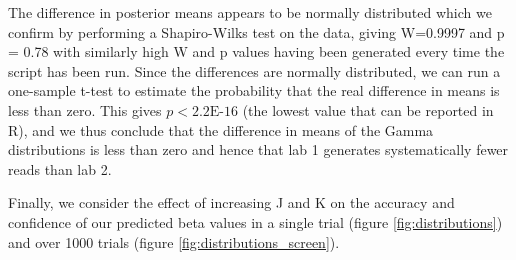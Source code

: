 \documentclass{article}
\begin{document}
%
%
%
%
%
%
\newpage
The difference in posterior means appears to be normally distributed which we confirm by performing a Shapiro-Wilks test on the data, giving W=0.9997 and p = 0.78 with similarly high W and p values having been generated every time the script has been run. Since the differences are normally distributed, we can run a one-sample t-test to estimate the probability that the real difference in means is less than zero. This gives $p < 2.2\text{E-16}$ (the lowest value that can be reported in R), and we thus conclude that the difference in means of the Gamma distributions is less than zero and hence that lab 1 generates systematically fewer reads than lab 2.

Finally, we consider the effect of increasing J and K on the accuracy and confidence of our predicted beta values in a single trial (figure \ref{fig:distributions}) and over 1000 trials (figure \ref{fig:distributions_screen}).
\end{document}
